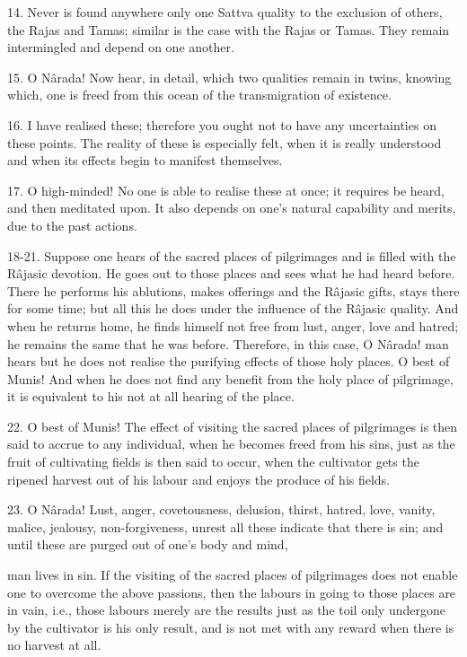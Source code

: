 14. Never is found anywhere only one Sattva quality to the exclusion of others, the Rajas and Tamas; similar is the case with the Rajas or Tamas. They remain intermingled and depend on one another.

15. O N\^arada! Now hear, in detail, which two qualities remain in twins, knowing which, one is freed from this ocean of the transmigration of existence.

16. I have realised these; therefore you ought not to have any uncertainties on these points. The reality of these is especially felt, when it is really understood and when its effects begin to manifest themselves.

17. O high-minded! No one is able to realise these at once; it requires be heard, and then meditated upon. It also depends on one's natural capability and merits, due to the past actions.

18-21. Suppose one hears of the sacred places of pilgrimages and is filled with the R\^ajasic devotion. He goes out to those places and sees what he had heard before. There he performs his ablutions, makes offerings and the R\^ajasic gifts, stays there for some time; but all this he does under the influence of the R\^ajasic quality. And when he returns home, he finds himself not free from lust, anger, love and hatred; he remains the same that he was before. Therefore, in this case, O N\^arada! man hears but he does not realise the purifying effects of those holy places. O best of Munis! And when he does not find any benefit from the holy place of pilgrimage, it is equivalent to his not at all hearing of the place.

22. O best of Munis! The effect of visiting the sacred places of pilgrimages is then said to accrue to any individual, when he becomes freed from his sins, just as the fruit of cultivating fields is then said to occur, when the cultivator gets the ripened harvest out of his labour and enjoys the produce of his fields.

23. O N\^arada! Lust, anger, covetousness, delusion, thirst, hatred, love, vanity, malice, jealousy, non-forgiveness, unrest all these indicate that there is sin; and until these are purged out of one's body and mind,

man lives in sin. If the visiting of the sacred places of pilgrimages does not enable one to overcome the above passions, then the labours in going to those places are in vain, i.e., those labours merely are the results just as the toil only undergone by the cultivator is his only result, and is not met with any reward when there is no harvest at all.

